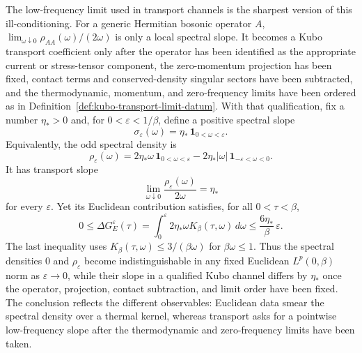 The low-frequency limit used in transport channels is the sharpest version
of this ill-conditioning.  For a generic Hermitian bosonic operator \(A\),
\(\lim_{\omega\downarrow0}\rho_{AA}(\omega)/(2\omega)\) is only a local
spectral slope.  It becomes a Kubo transport coefficient only after the
operator has been identified as the appropriate current or stress-tensor
component, the zero-momentum projection has been fixed, contact terms and
conserved-density singular sectors have been subtracted, and the
thermodynamic, momentum, and zero-frequency limits have been ordered as in
Definition~\ref{def:kubo-transport-limit-datum}.  With that qualification,
fix a number \(\eta_\ast>0\) and, for
\(0<\varepsilon<1/\beta\), define a positive spectral slope
\[
  \sigma_\varepsilon(\omega)
  =
  \eta_\ast\,\mathbf 1_{0<\omega<\varepsilon}.
\]
Equivalently, the odd spectral density is
\[
  \rho_\varepsilon(\omega)
  =
  2\eta_\ast\omega\,\mathbf 1_{0<\omega<\varepsilon}
  -2\eta_\ast|\omega|\,\mathbf 1_{-\varepsilon<\omega<0}.
\]
It has transport slope
\[
  \lim_{\omega\downarrow0}\frac{\rho_\varepsilon(\omega)}{2\omega}
  =
  \eta_\ast
\]
for every \(\varepsilon\).  Yet its Euclidean contribution satisfies, for all
\(0<\tau<\beta\),
\begin{equation}
  0\le
  \Delta G_E^\varepsilon(\tau)
  =
  \int_0^\varepsilon
  2\eta_\ast\omega K_\beta(\tau,\omega)\,d\omega
  \le
  \frac{6\eta_\ast}{\beta}\,\varepsilon .
  \label{eq:thermal-transport-instability-example}
\end{equation}
The last inequality uses \(K_\beta(\tau,\omega)\le 3/(\beta\omega)\) for
\(\beta\omega\le1\).  Thus the spectral densities \(0\) and
\(\rho_\varepsilon\) become indistinguishable in any fixed Euclidean
\(L^p(0,\beta)\) norm as \(\varepsilon\to0\), while their slope in a qualified
Kubo channel differs by \(\eta_\ast\) once the operator, projection, contact
subtraction, and limit order have been fixed.  The conclusion reflects the
different observables: Euclidean data smear the spectral density over a
thermal kernel, whereas transport asks for a pointwise low-frequency slope
after the thermodynamic and zero-frequency limits have been taken.

